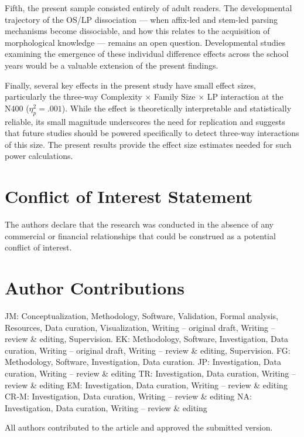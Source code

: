 \documentclass[utf8]{FrontiersinHarvard} %
\begin{document}
	Fifth, the present sample consisted entirely of adult readers. The developmental trajectory of the OS/LP dissociation --- when affix-led and stem-led parsing mechanisms become dissociable, and how this relates to the acquisition of morphological knowledge --- remains an open question. Developmental studies examining the emergence of these individual difference effects across the school years would be a valuable extension of the present findings.
	
	Finally, several key effects in the present study have small effect sizes, particularly the three-way Complexity $\times$ Family Size $\times$ LP interaction at the N400 ($\eta^2_p = .001$). While the effect is theoretically interpretable and statistically reliable, its small magnitude underscores the need for replication and suggests that future studies should be powered specifically to detect three-way interactions of this size. The present results provide the effect size estimates needed for such power calculations.
	
	\section*{Conflict of Interest Statement}
	The authors declare that the research was conducted in the absence of any commercial or financial relationships that could be construed as a potential conflict of interest.
	
	\section*{Author Contributions}
	JM: Conceptualization, Methodology, Software, Validation, Formal analysis, Resources, Data curation, Visualization, Writing – original draft, Writing – review \& editing, Supervision.
	EK: Methodology, Software, Investigation, Data curation, Writing – original draft, Writing – review \& editing, Supervision.
	FG: Methodology, Software, Investigation, Data curation.
	JP: Investigation, Data curation, Writing – review \& editing
	TR: Investigation, Data curation, Writing – review \& editing
	EM: Investigation, Data curation, Writing – review \& editing
	CR-M: Investigation, Data curation, Writing – review \& editing
	NA: Investigation, Data curation, Writing – review \& editing
	
	All authors contributed to the article and approved the submitted version.
	
\end{document}
